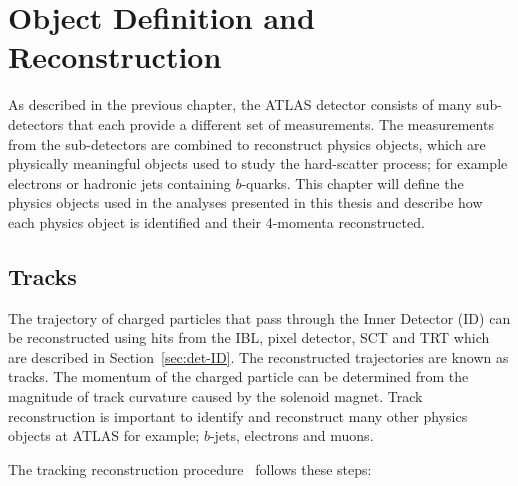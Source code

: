 \chapter{Object Definition and Reconstruction}
\label{sec:obj}

As described in the previous chapter,
the ATLAS detector consists of many sub-detectors
that each provide a different set of measurements.
The measurements from the sub-detectors are combined to reconstruct physics objects,
which are physically meaningful objects used to study the hard-scatter process;
for example electrons or hadronic jets containing $b$-quarks.
This chapter will define the physics objects used in the analyses presented in this thesis
and describe how each physics object is identified and their 4-momenta reconstructed.

\section{Tracks}
\label{sec:obj-tracks}

The trajectory of charged particles that pass through the Inner Detector (ID) can be reconstructed
using hits from the IBL, pixel detector, SCT and TRT which are described in Section~\ref{sec:det-ID}.
The reconstructed trajectories are known as tracks.
The momentum of the charged particle can be determined from the magnitude of track curvature caused by the solenoid magnet.
Track reconstruction is important to identify and reconstruct many other physics objects at ATLAS
for example; $b$-jets, electrons and muons.

\noindent
The tracking reconstruction procedure~\cite{obj-tracks_TIDE} follows these steps:

